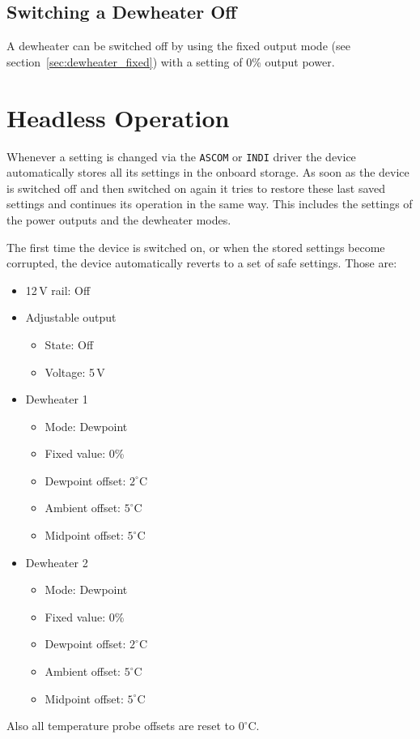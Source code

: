 \documentclass{scrartcl}
\begin{document}
\subsection{Switching a Dewheater Off}
A dewheater can be switched off by using the fixed output mode (see
section~\ref{sec:dewheater_fixed}) with a setting of 0\% output power.

\section{Headless Operation}
Whenever a setting is changed via the \texttt{ASCOM} or \texttt{INDI} driver the
device automatically stores all its settings in the onboard storage. As soon as
the device is switched off and then switched on again it tries to restore these
last saved settings and continues its operation in the same way. This includes
the settings of the power outputs and the dewheater modes.

The first time the device is switched on, or when the stored settings become
corrupted, the device automatically reverts to a set of safe settings. Those
are:
\begin{itemize}
  \item 12\,V rail: Off
  \item Adjustable output
    \begin{itemize}
      \item State: Off
      \item Voltage: 5\,V
    \end{itemize}
  \item Dewheater 1
    \begin{itemize}
      \item Mode: Dewpoint
      \item Fixed value: 0\%
      \item Dewpoint offset: $2^{\circ}$C
      \item Ambient offset: $5^{\circ}$C
      \item Midpoint offset: $5^{\circ}$C
    \end{itemize}
  \item Dewheater 2
    \begin{itemize}
      \item Mode: Dewpoint
      \item Fixed value: 0\%
      \item Dewpoint offset: $2^{\circ}$C
      \item Ambient offset: $5^{\circ}$C
      \item Midpoint offset: $5^{\circ}$C
    \end{itemize}
\end{itemize}
Also all temperature probe offsets are reset to $0^{\circ}$C.
\end{document}
